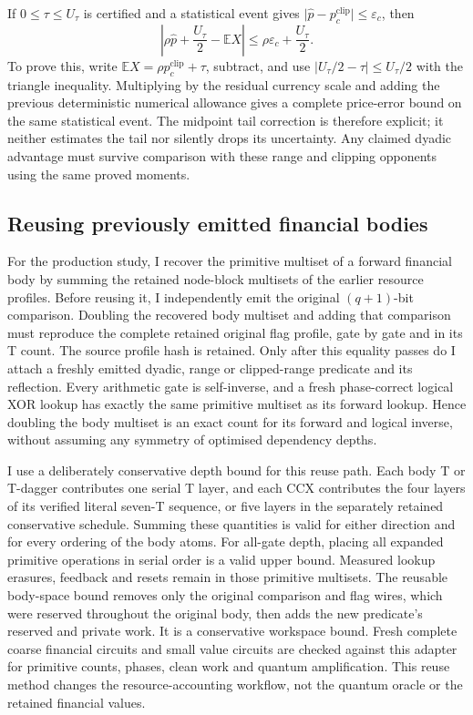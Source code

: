 If \(0\leq\tau\leq U_\tau\) is certified and a statistical event gives
\(\lvert\widehat p-p_c^{\mathrm{clip}}\rvert\leq\varepsilon_c\),
then
\[
 \left\lvert\rho\widehat p+\frac{U_\tau}{2}-\mathbb E X\right\rvert
 \leq\rho\varepsilon_c+\frac{U_\tau}{2}.                  \tag{V11}
\]
To prove this, write \(\mathbb E X=\rho p_c^{\mathrm{clip}}+\tau\),
subtract, and use
\(\lvert U_\tau/2-\tau\rvert\leq U_\tau/2\) with the triangle
inequality. Multiplying by the residual currency scale and adding the
previous deterministic numerical allowance gives a complete price-error
bound on the same statistical event. The midpoint tail correction is
therefore explicit; it neither estimates the tail nor silently drops its
uncertainty. Any claimed dyadic advantage must survive comparison with
these range and clipping opponents using the same proved moments.

\subsection{Reusing previously emitted financial bodies}

For the production study, I recover the primitive multiset of a forward
financial body by summing the retained node-block multisets of the earlier
resource profiles. Before reusing it, I independently emit the original
\((q+1)\)-bit comparison. Doubling the recovered body multiset and adding
that comparison must reproduce the complete retained original flag profile,
gate by gate and in its T count. The source profile hash is retained.
Only after this equality passes do I attach a freshly emitted dyadic,
range or clipped-range predicate and its reflection. Every arithmetic gate
is self-inverse, and a fresh phase-correct logical XOR lookup has exactly
the same primitive multiset as its forward lookup. Hence doubling the
body multiset is an exact count for its forward and logical inverse,
without assuming any symmetry of optimised dependency depths.

I use a deliberately conservative depth bound for this reuse path. Each
body T or T-dagger contributes one serial T layer, and each CCX contributes
the four layers of its verified literal seven-T sequence, or five layers
in the separately retained conservative schedule. Summing these quantities
is valid for either direction and for every ordering of the body atoms.
For all-gate depth, placing all expanded primitive operations in serial
order is a valid upper bound. Measured lookup erasures, feedback and resets
remain in those primitive multisets. The reusable body-space bound removes
only the original comparison and flag wires, which were reserved throughout
the original body, then adds the new predicate's reserved and private work.
It is a conservative workspace bound. Fresh complete coarse financial
circuits and small value circuits are checked against this adapter for
primitive counts, phases, clean work and quantum amplification. This
reuse method changes the resource-accounting workflow, not the quantum
oracle or the retained financial values.

